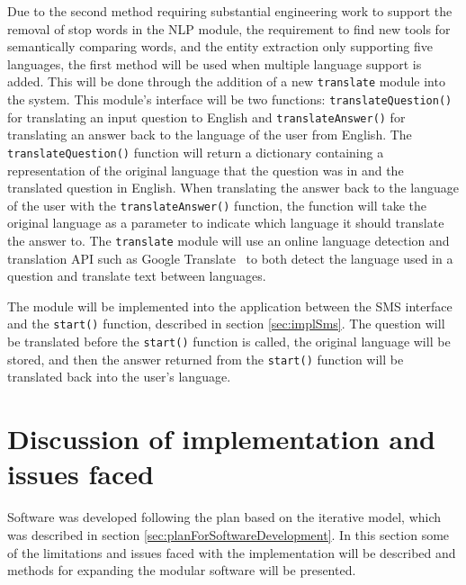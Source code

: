 \documentclass[authoryearcitations]{UoYCSproject}
\begin{document}
Due to the second method requiring substantial engineering work to support the removal of stop words in the NLP module, the requirement to find new tools for semantically comparing words, and the entity extraction only supporting five languages, the first method will be used when multiple language support is added. This will be done through the addition of a new \texttt{translate} module into the system. This module's interface will be two functions: \texttt{translateQuestion()} for translating an input question to English and \texttt{translateAnswer()} for translating an answer back to the language of the user from English. The \texttt{translateQuestion()} function will return a dictionary containing a representation of the original language that the question was in and the translated question in English. When translating the answer back to the language of the user with the \texttt{translateAnswer()} function, the function will take the original language as a parameter to indicate which language it should translate the answer to. The \texttt{translate} module will use an online language detection and translation API such as Google Translate~\cite{googleTranslateApi} to both detect the language used in a question and translate text between languages. 

The module will be implemented into the application between the SMS interface and the \texttt{start()} function, described in section \ref{sec:implSms}. The question will be translated before the \texttt{start()} function is called, the original language will be stored, and then the answer returned from the \texttt{start()} function will be translated back into the user's language.

\section{Discussion of implementation and issues faced}

Software was developed following the plan based on the iterative model, which was described in section \ref{sec:planForSoftwareDevelopment}. In this section some of the limitations and issues faced with the implementation will be described and methods for expanding the modular software will be presented.
\end{document}
